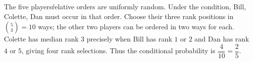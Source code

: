 The five players\' relative orders are uniformly random. Under the condition, Bill, Colette, Dan must occur in that order. Choose their three rank positions in $\binom{5}{3}=10$ ways; the other two players can be ordered in two ways for each. Colette has median rank $3$ precisely when Bill has rank $1$ or $2$ and Dan has rank $4$ or $5$, giving four rank selections. Thus the conditional probability is $\boxed{\dfrac{4}{10}=\dfrac{2}{5}}$.
